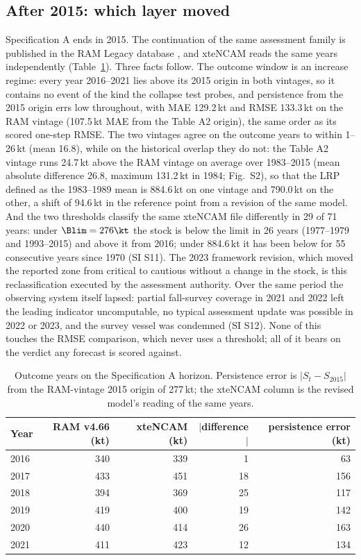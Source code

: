 \FloatBarrier
\subsection{After 2015: which layer moved}\label{sec:verdict}

Specification A ends in 2015. The continuation of the same assessment family is published in the RAM Legacy database \citep[v4.66, stock COD2J3KL;][]{Ricard2012}, and xteNCAM reads the same years independently (Table~\ref{tab:outcome}). Three facts follow. The outcome window is an increase regime: every year 2016--2021 lies above its 2015 origin in both vintages, so it contains no event of the kind the collapse test probes, and persistence from the 2015 origin errs low throughout, with MAE 129.2\,kt and RMSE 133.3\,kt on the RAM vintage (107.5\,kt MAE from the Table A2 origin), the same order as its scored one-step RMSE. The two vintages agree on the outcome years to within 1--26\,kt (mean 16.8), while on the historical overlap they do not: the Table A2 vintage runs 24.7\,kt above the RAM vintage on average over 1983--2015 (mean absolute difference 26.8, maximum 131.2\,kt in 1984; Fig.~S2), so that the LRP defined as the 1983--1989 mean is 884.6\,kt on one vintage and 790.0\,kt on the other, a shift of 94.6\,kt in the reference point from a revision of the same model. And the two thresholds classify the same xteNCAM file differently in 29 of 71 years: under $\Blim = 276\kt$ the stock is below the limit in 26 years (1977--1979 and 1993--2015) and above it from 2016; under 884.6\,kt it has been below for 55 consecutive years since 1970 (SI S11). The 2023 framework revision, which moved the reported zone from critical to cautious without a change in the stock, is this reclassification executed by the assessment authority. Over the same period the observing system itself lapsed: partial fall-survey coverage in 2021 and 2022 left the leading indicator uncomputable, no typical assessment update was possible in 2022 or 2023, and the survey vessel was condemned (SI S12). None of this touches the RMSE comparison, which never uses a threshold; all of it bears on the verdict any forecast is scored against.

\begin{table}[!htb]
\centering\small
\caption{Outcome years on the Specification A horizon. Persistence error is $|S_t - S_{2015}|$ from the RAM-vintage 2015 origin of 277\,kt; the xteNCAM column is the revised model's reading of the same years.}
\label{tab:outcome}
\begin{tabular}{@{}lrrrr@{}}
\toprule
Year & RAM v4.66 (kt) & xteNCAM (kt) & $|$difference$|$ & persistence error (kt) \\
\midrule
2016 & 340 & 339 & 1 & 63 \\
2017 & 433 & 451 & 18 & 156 \\
2018 & 394 & 369 & 25 & 117 \\
2019 & 419 & 400 & 19 & 142 \\
2020 & 440 & 414 & 26 & 163 \\
2021 & 411 & 423 & 12 & 134 \\
\bottomrule
\end{tabular}
\end{table}
